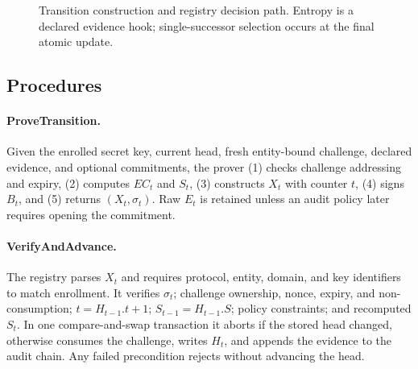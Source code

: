 \documentclass[11pt]{article}
\begin{document}
\begin{figure}[t]
\centering
{}
\caption{Transition construction and registry decision path. Entropy is a declared evidence hook; single-successor selection occurs at the final atomic update.}
\label{fig:transition}
\end{figure}

\subsection{Procedures}
\paragraph{ProveTransition.} Given the enrolled secret key, current head, fresh entity-bound challenge, declared evidence, and optional commitments, the prover (1) checks challenge addressing and expiry, (2) computes $EC_t$ and $S_t$, (3) constructs $X_t$ with counter $t$, (4) signs $B_t$, and (5) returns $(X_t,\sigma_t)$. Raw $E_t$ is retained unless an audit policy later requires opening the commitment.

\paragraph{VerifyAndAdvance.} The registry parses $X_t$ and requires protocol, entity, domain, and key identifiers to match enrollment. It verifies $\sigma_t$; challenge ownership, nonce, expiry, and non-consumption; $t=H_{t-1}.t+1$; $S_{t-1}=H_{t-1}.S$; policy constraints; and recomputed $S_t$. In one compare-and-swap transaction it aborts if the stored head changed, otherwise consumes the challenge, writes $H_t$, and appends the evidence to the audit chain. Any failed precondition rejects without advancing the head.
\end{document}
